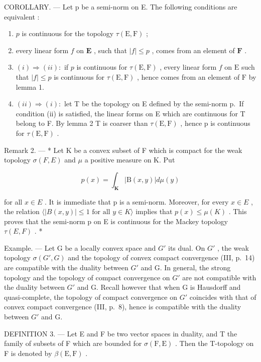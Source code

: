 COROLLARY. --- Let p be a semi-norm on E. The following conditions are equivalent :

\begin{enumerate}
\def\labelenumi{(\roman{enumi})}
\item
  \(p\) is continuous for the topology \(\tau(\mathrm{E},\mathrm{F})\) ;
\item
  every linear form \(f\) on \(\mathbf{E}\) , such that \(|f| \leqslant p\) , comes from an element of \(\mathbf{F}\) .
\item[]
  \((i) \Rightarrow (ii):\) if \(p\) is continuous for \(\tau(\mathrm{E},\mathrm{F})\) , every linear form \(f\) on \(\mathrm{E}\) such that \(|f|\leqslant p\) is continuous for \(\tau(\mathrm{E},\mathrm{F})\) , hence comes from an element of \(\mathrm{F}\) by lemma 1.
\item[]
  \((ii) \Rightarrow (i):\) let T be the topology on E defined by the semi-norm p.~If condition (ii) is satisfied, the linear forms on E which are continuous for T belong to F. By lemma 2 T is coarser than \(\tau(\mathrm{E}, \mathrm{F})\) , hence p is continuous for \(\tau(\mathrm{E}, \mathrm{F})\) .
\end{enumerate}

Remark 2. --- * Let K be a convex subset of F which is compact for the weak topology \(\sigma(F, E)\) and \(\mu\) a positive measure on K. Put

\[
p (x) = \int_ {\mathbf {K}} | \mathrm{B} (x, y) | d \mu (y)
\]

for all \(x \in E\) . It is immediate that p is a semi-norm. Moreover, for every \(x \in E\) , the relation \(\langle |B(x, y)| \leqslant 1 \text{ for all } y \in K \rangle\) implies that \(p(x) \leqslant \mu(K)\) . This proves that the semi-norm p on E is continuous for the Mackey topology \(\tau(E, F)\) . *

Example. --- Let G be a locally convex space and \(G'\) its dual. On \(G'\) , the weak topology \(\sigma(G', G)\) and the topology of convex compact convergence (III, p.~14) are compatible with the duality between \(G'\) and G. In general, the strong topology and the topology of compact convergence on \(G'\) are not compatible with the duality between \(G'\) and G. Recall however that when G is Hausdorff and quasi-complete, the topology of compact convergence on \(G'\) coincides with that of convex compact convergence (III, p.~8), hence is compatible with the duality between \(G'\) and G.

DEFINITION 3. --- Let E and F be two vector spaces in duality, and T the family of subsets of F which are bounded for \(\sigma(\mathrm{F}, \mathrm{E})\) . Then the T-topology on F is denoted by \(\beta(\mathrm{E}, \mathrm{F})\) .

